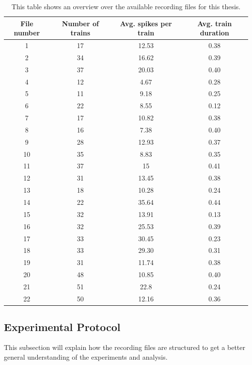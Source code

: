 \begin{table}[!ht]
\centering
\begin{tabular}{ |c|c|c|c| }
	\hline
	File number & Number of trains  & Avg. spikes per train & Avg. train duration\\
	\hline
	1 & 17 & 12.53 & 0.38 \\
	2 & 34 & 16.62 & 0.39 \\
	3 & 37 & 20.03 & 0.40 \\
	4 & 12 & 4.67 & 0.28 \\
	5 & 11 & 9.18 & 0.25 \\
	6 & 22 & 8.55 & 0.12 \\
	7 & 17 & 10.82 & 0.38 \\
	8 & 16 & 7.38 & 0.40 \\
	9 & 28 & 12.93 & 0.37 \\
	10 & 35 & 8.83 & 0.35 \\
	11 & 37 & 15 & 0.41 \\
	12 & 31 & 13.45 & 0.38 \\
	13 & 18 & 10.28 & 0.24 \\
	14 & 22 & 35.64 & 0.44 \\
	15 & 32 & 13.91 & 0.13 \\
	16 & 32 & 25.53 & 0.39 \\
	17 & 33 & 30.45 & 0.23 \\
	18 & 33 & 29.30 & 0.31 \\
	19 & 31 & 11.74 & 0.38 \\
	20 & 48 & 10.85 & 0.40 \\
	21 & 51 & 22.8 & 0.24 \\
	22 & 50 & 12.16 & 0.36\\
	\hline
\end{tabular}
\caption{This table shows an overview over the available recording files for this thesis.}
\label{table:recording_overview}
\end{table}

\subsection{Experimental Protocol}
This subsection will explain how the recording files are structured to get a better general understanding of the experiments and analysis.

